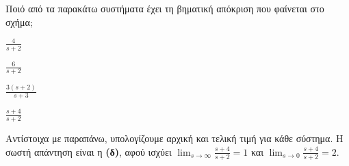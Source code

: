 \documentclass[11pt,a4paper,notitlepage,fleqn]{article}
\begin{document}
\begin{exercise}
Ποιό από τα παρακάτω συστήματα έχει τη βηματική απόκριση που φαίνεται στο σχήμα;


\begin{enumlatin}
	\item \( \displaystyle \frac{4}{s+2} \)
	\item \( \displaystyle \frac{6}{s+2} \)
	\item \( \displaystyle \frac{3(s+2)}{s+3} \)
	\item \( \displaystyle \frac{s+4}{s+2} \)
\end{enumlatin}

\tcblower

Αντίστοιχα με παραπάνω, υπολογίζουμε αρχική και τελική τιμή για κάθε σύστημα. Η σωστή απάντηση είναι η
\textbf{(δ)}, αφού ισχύει \( \lim_{s\to \infty} \frac{s+4}{s+2} = 1 \) και \( \lim_{s\to 0} \frac{s+4}{s+2} = 2 \).

\end{exercise}
\end{document}
